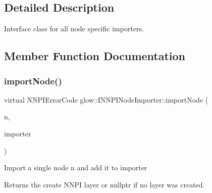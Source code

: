 \subsection{Detailed Description}
Interface class for all node specific importers. 

\subsection{Member Function Documentation}
\mbox{\label{classglow_1_1_i_n_n_p_i_node_importer_aa861e10cb0c17a92abb94bf613b57807}} 
\subsubsection{\texorpdfstring{import\+Node()}{importNode()}}
{\footnotesize\ttfamily virtual N\+N\+P\+I\+Error\+Code glow\+::\+I\+N\+N\+P\+I\+Node\+Importer\+::import\+Node (\begin{DoxyParamCaption}\item[{\hyperlink{classglow_1_1_node}{Node} $\ast$}]{n,  }\item[{\hyperlink{classglow_1_1_n_n_p_i_importer}{N\+N\+P\+I\+Importer} \&}]{importer }\end{DoxyParamCaption})\hspace{0.3cm}{\ttfamily [pure virtual]}}

Import a single node {\ttfamily n} and add it to {\ttfamily importer} \begin{DoxyReturn}{Returns}
the create N\+N\+PI layer or nullptr if no layer was created. 
\end{DoxyReturn}


